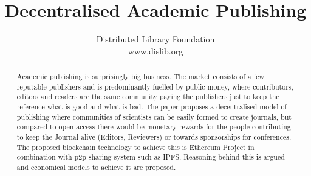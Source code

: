 \documentclass[12pt, a4paper]{article}
\title{Decentralised Academic Publishing}
\author
{Distributed Library Foundation
\\
\normalsize{www.dislib.org}
}
\date{}
\begin{document}
 


\maketitle 
\thispagestyle{title}

\begin{abstract}
Academic publishing is surprisingly big business. The market consists of a few reputable publishers and is predominantly fuelled by public money, where contributors, editors and readers are the same community paying the publishers just to keep the reference what is good and what is bad. The paper proposes a decentralised model of publishing where communities of scientists can be easily formed to create journals, but compared to open access there would be monetary rewards for the people contributing to keep the Journal alive (Editors, Reviewers) or towards sponsorships for conferences. The proposed blockchain technology to achieve this is Ethereum Project in combination with p2p sharing system such as IPFS. Reasoning behind this is argued and economical models to achieve it are proposed.
\end{abstract}


\end{document}
